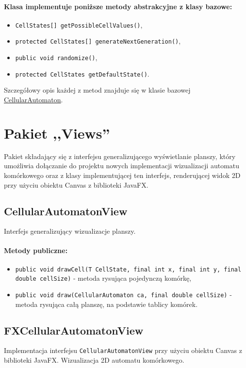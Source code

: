 \documentclass{report}
\begin{document}
\paragraph{Klasa implementuje poniższe metody abstrakcyjne z klasy bazowe:}
\begin{itemize}
    \item \texttt{CellStates[] getPossibleCellValues()},
    \item \texttt{protected CellStates[] generateNextGeneration()},
    \item \texttt{public void randomize()},
    \item \texttt{protected CellStates getDefaultState()}.
\end{itemize}
Szczegółowy opis każdej z metod znajduje się w klasie bazowej \hyperref[subsec:cellularAutomaton]{CellularAutomaton}.

\section{Pakiet ,,Views''}
Pakiet składający się z interfejsu generalizującego wyświetlanie planszy, który umożliwia dołączanie do projektu nowych implementacji wizualizacji automatu komórkowego oraz z klasy implementującej ten interfejs, renderującej widok 2D przy użyciu obiektu Canvas z biblioteki JavaFX.
\subsection{CellularAutomatonView}
Interfejs generalizujący wizualizacje planszy.
\paragraph{Metody publiczne:}
\begin{itemize}
	\item \texttt{public void drawCell(T CellState, final int x, final int y, final double cellSize)} - metoda rysująca pojedynczą komórkę,
	\item \texttt{public void draw(CellularAutomaton ca, final double cellSize)} - metoda rysująca całą planszę, na podstawie tablicy komórek.
\end{itemize}
\subsection{FXCellularAutomatonView}
Implementacja interfejsu \texttt{CellularAutomatonView} przy użyciu obiektu Canvas z biblioteki JavaFX. Wizualizacja 2D automatu komórkowego.
\end{document}
